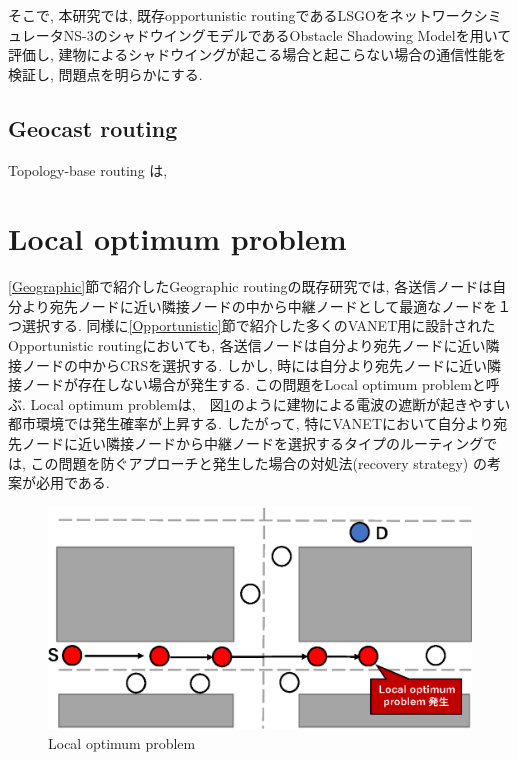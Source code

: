 \documentclass[10pt]{jreport}
\begin{document}
そこで, 本研究では, 既存opportunistic routingであるLSGOをネットワークシミュレータNS-3\cite{19}のシャドウイングモデルであるObstacle Shadowing Model\cite{20}を用いて評価し, 建物によるシャドウイングが起こる場合と起こらない場合の通信性能を検証し, 問題点を明らかにする.





\subsection{Geocast routing}
Topology-base routing\cite {3,4,5} は, 

\section{Local optimum problem}
\label{local_optimum_problem}
\ref{Geographic}節で紹介したGeographic routingの既存研究では, 各送信ノードは自分より宛先ノードに近い隣接ノードの中から中継ノードとして最適なノードを１つ選択する. 同様に\ref{Opportunistic}節で紹介した多くのVANET用に設計されたOpportunistic routingにおいても, 各送信ノードは自分より宛先ノードに近い隣接ノードの中からCRSを選択する. しかし, 時には自分より宛先ノードに近い隣接ノードが存在しない場合が発生する. この問題をLocal optimum problem\cite{6}と呼ぶ. Local optimum problemは,　図\ref{fig:Local_optimum}のように建物による電波の遮断が起きやすい都市環境では発生確率が上昇する. したがって, 特にVANETにおいて自分より宛先ノードに近い隣接ノードから中継ノードを選択するタイプのルーティングでは, この問題を防ぐアプローチと発生した場合の対処法(recovery strategy) の考案が必用である.

\begin{figure}[!ht]
	\centering
	\includegraphics[width=130mm]{figures/Local_optimum_problem.eps}
	\caption{Local optimum problem}
	\label{fig:Local_optimum}
\end{figure}
\end{document}
